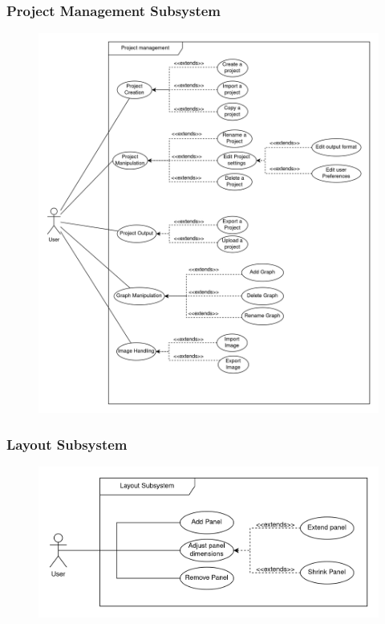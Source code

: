 \documentclass[11pt,a4paper]{article}
\begin{document}
\subsubsection*{Project Management Subsystem}
\begin{figure}[htbp]
    \centering
    \includegraphics[width=1\textwidth]{../diagramPng/Usecase Project-Subsystem.png}
\end{figure}

\pagebreak
\subsubsection*{Layout Subsystem}
\begin{figure}[htbp]
    \centering
     \includegraphics[width=1\textwidth]{../diagramPng/Usecase Layout-Subsystem.png}
\end{figure}
\end{document}
